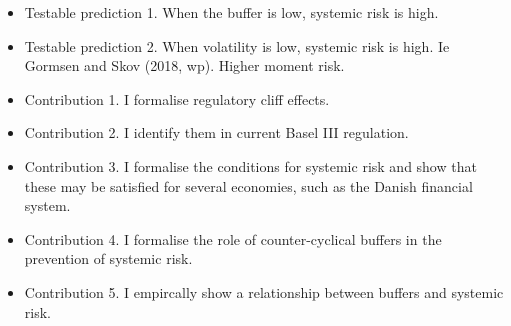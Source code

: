 \documentclass[11pt]{article}
\begin{document}
\begin{appendices}
\begin{itemize}
\item Testable prediction 1. When the buffer is low, systemic risk is high.

\item Testable prediction 2. When volatility is low, systemic risk is high. Ie Gormsen and Skov (2018, wp). Higher moment risk.

\item Contribution 1. I formalise regulatory cliff effects.

\item Contribution 2. I identify them in current Basel III regulation. 

\item Contribution 3. I formalise the conditions for systemic risk and show that these may be satisfied for several economies, such as the Danish financial system.

\item Contribution 4. I formalise the role of counter-cyclical buffers in the prevention of systemic risk. 

\item Contribution 5. I empircally show a relationship between buffers and systemic risk.

\end{itemize}

\fi

\end{appendices}
\end{document}
